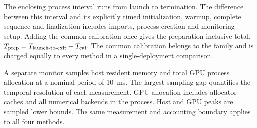 The enclosing process interval runs from launch to termination.
The difference between this interval and its explicitly timed
initialization, warmup, complete sequence and finalization includes
imports, process creation and monitoring setup. Adding the common
calibration once gives the preparation-inclusive total,
$T_{\rm prep}=T_{\rm launch\text{-}to\text{-}exit}+T_{\rm cal}$. The common
calibration belongs to the family and is charged equally to every
method in a single-deployment comparison.

A separate monitor samples host resident memory and total GPU process
allocation at a nominal period of 10~ms. The largest sampling gap
quantifies the temporal resolution of each measurement. GPU allocation includes allocator
caches and all numerical backends in the process. Host and GPU
peaks are sampled lower bounds. The same measurement and accounting
boundary applies to all four methods.
